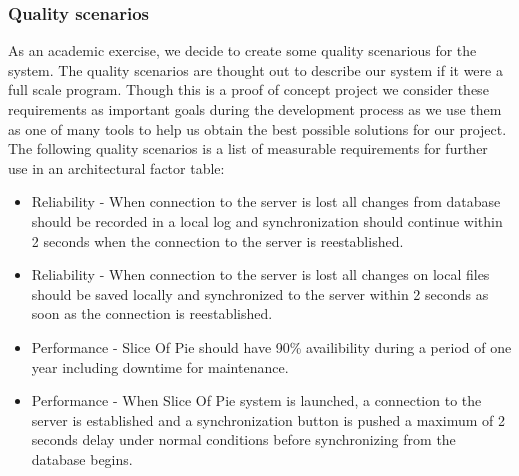 \subsubsection{Quality scenarios}
As an academic exercise, we decide to create some quality scenarious for the system. The quality scenarios are thought out to describe our system
if it were a full scale program. Though this is a proof of concept project we consider these requirements as important goals during the development process as we use them as one of many tools to help us obtain the best possible solutions for our project.
The following quality scenarios is a list of measurable requirements for further use in an architectural factor table:
\begin{itemize}
\item Reliability -  When connection to the server is lost all changes from database should be recorded in a local log and synchronization should continue within 2 seconds when the connection to the server is reestablished.
\item Reliability - When connection to the server is lost all changes on local files should be saved locally and synchronized to the server within 2 seconds as soon as the connection is reestablished.
\item Performance - Slice Of Pie should have 90\% availibility during a period of one year including downtime for  maintenance.
\item Performance - When Slice Of Pie system is launched, a connection to the server is established and a synchronization button is pushed a maximum of 2 seconds delay under normal conditions before synchronizing from the database begins.
\end{itemize}